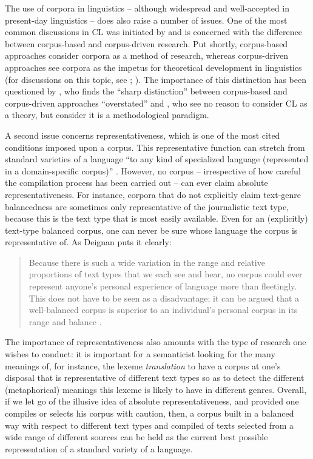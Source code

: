 The use of corpora in linguistics – although widespread and well-accepted in present-day linguistics – does also raise a number of issues. One of the most common discussions in CL was initiated by \citet{tognini-bonelli_corpus_2001} and is concerned with the difference between corpus-based and corpus-driven research. Put shortly, corpus-based approaches consider corpora as a method of research, whereas corpus-driven approaches see corpora as the impetus for theoretical development in linguistics (for discussions on this topic, see \citet[384-385]{hardie_two_2010}; \citet[150 ff.]{mcenery_corpus_2012}). The importance of this distinction has been questioned by \citet[994]{ludeling_theory-driven_2009}, who finds the “sharp distinction” between corpus-based and corpus-driven approaches “overstated” and \citet[328]{gries_behavioral_2010}, who see no reason to consider CL as a theory, but consider it is a methodological paradigm.



A second issue concerns representativeness, which is one of the most cited conditions imposed upon a corpus. This representative function can stretch from standard varieties of a language “to any kind of specialized language (represented in a domain-specific corpus)” \citep[11]{aijmer_state_1991}. However, no corpus – irrespective of how careful the compilation process has been carried out – can ever claim absolute representativeness. For instance, corpora that do not explicitly claim text-genre balancedness are sometimes only representative of the journalistic text type, because this is the text type that is most easily available. Even for an (explicitly) text-type balanced corpus, one can never be sure whose language the corpus is representative of. As Deignan puts it clearly:


\begin{quote}
Because there is such a wide variation in the range and relative proportions of text types that we each see and hear, no corpus could ever represent anyone’s personal experience of language more than fleetingly. This does not have to be seen as a disadvantage; it can be argued that a well-balanced corpus is superior to an individual’s personal corpus in its range and balance \citep[91]{deignan_metaphor_2005}.
\end{quote}


The importance of representativeness also amounts with the type of research one wishes to conduct: it is important for a semanticist looking for the many meanings of, for instance, the lexeme \textit{translation} to have a corpus at one’s disposal that is representative of different text types so as to detect the different (metaphorical) meanings this lexeme is likely to have in different genres. Overall, if we let go of the illusive idea of absolute representativeness, and provided one compiles or selects his corpus with caution, then, a corpus built in a balanced way with respect to different text types and compiled of texts selected from a wide range of different sources can be held as the current best possible representation of a standard variety of a language.



